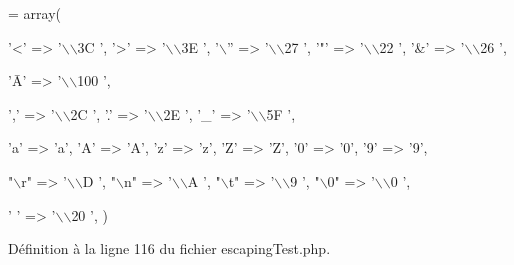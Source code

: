\begin{DoxyCode}
= array(
        
        \textcolor{charliteral}{'<'} => \textcolor{stringliteral}{'\(\backslash\)\(\backslash\)3C '},
        \textcolor{charliteral}{'>'} => \textcolor{stringliteral}{'\(\backslash\)\(\backslash\)3E '},
        \textcolor{charliteral}{'\(\backslash\)''} => \textcolor{stringliteral}{'\(\backslash\)\(\backslash\)27 '},
        \textcolor{charliteral}{'"'} => \textcolor{stringliteral}{'\(\backslash\)\(\backslash\)22 '},
        \textcolor{charliteral}{'&'} => \textcolor{stringliteral}{'\(\backslash\)\(\backslash\)26 '},
        
        \textcolor{stringliteral}{'Ā'} => \textcolor{stringliteral}{'\(\backslash\)\(\backslash\)100 '},
        
        \textcolor{charliteral}{','} => \textcolor{stringliteral}{'\(\backslash\)\(\backslash\)2C '},
        \textcolor{charliteral}{'.'} => \textcolor{stringliteral}{'\(\backslash\)\(\backslash\)2E '},
        \textcolor{charliteral}{'\_'} => \textcolor{stringliteral}{'\(\backslash\)\(\backslash\)5F '},
        
        \textcolor{charliteral}{'a'} => \textcolor{charliteral}{'a'},
        \textcolor{charliteral}{'A'} => \textcolor{charliteral}{'A'},
        \textcolor{charliteral}{'z'} => \textcolor{charliteral}{'z'},
        \textcolor{charliteral}{'Z'} => \textcolor{charliteral}{'Z'},
        \textcolor{charliteral}{'0'} => \textcolor{charliteral}{'0'},
        \textcolor{charliteral}{'9'} => \textcolor{charliteral}{'9'},
        
        \textcolor{stringliteral}{"\(\backslash\)r"} => \textcolor{stringliteral}{'\(\backslash\)\(\backslash\)D '},
        \textcolor{stringliteral}{"\(\backslash\)n"} => \textcolor{stringliteral}{'\(\backslash\)\(\backslash\)A '},
        \textcolor{stringliteral}{"\(\backslash\)t"} => \textcolor{stringliteral}{'\(\backslash\)\(\backslash\)9 '},
        \textcolor{stringliteral}{"\(\backslash\)0"} => \textcolor{stringliteral}{'\(\backslash\)\(\backslash\)0 '},
        
        \textcolor{charliteral}{' '} => \textcolor{stringliteral}{'\(\backslash\)\(\backslash\)20 '},
    )
\end{DoxyCode}


Définition à la ligne 116 du fichier escaping\+Test.\+php.

